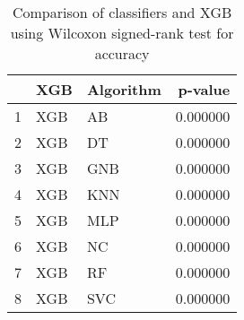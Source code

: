 \begin{table}
\footnotesize
\caption{Comparison of classifiers and XGB using Wilcoxon signed-rank test for accuracy}
\label{tab:XGB wilcoxon ACC comparison}
\begin{tabular}{lllr}
\hline
 & XGB & Algorithm & p-value \\
\hline
1 & XGB & AB & 0.000000 \\
2 & XGB & DT & 0.000000 \\
3 & XGB & GNB & 0.000000 \\
4 & XGB & KNN & 0.000000 \\
5 & XGB & MLP & 0.000000 \\
6 & XGB & NC & 0.000000 \\
7 & XGB & RF & 0.000000 \\
8 & XGB & SVC & 0.000000 \\
\hline
\end{tabular}
\end{table}
